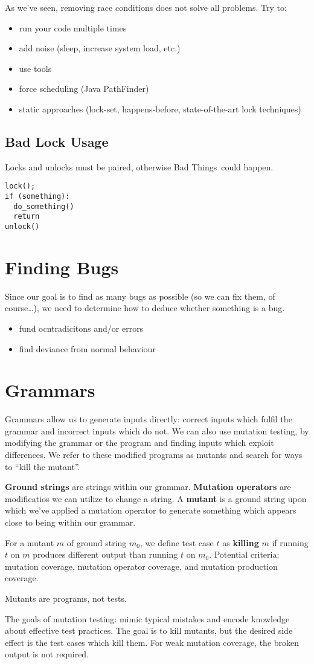 \documentclass[12pt]{article}
\begin{document}
As we've seen, removing race conditions does not solve all problems. Try to:
\begin{itemize}
\item run your code multiple times
\item add noise (sleep, increase system load, etc.)
\item use tools
\item force scheduling (Java PathFinder)
\item static approaches (lock-set, happens-before, state-of-the-art lock techniques)
\end{itemize}

\subsection{Bad Lock Usage}
Locks and unlocks must be paired, otherwise Bad Things\texttrademark\ could happen.
\begin{verbatim}
lock();
if (something):
  do_something()
  return
unlock()
\end{verbatim}

\section{Finding Bugs}
Since our goal is to find as many bugs as possible (so we can fix them, of course\dots), we need to determine how to deduce whether something is a bug.
\begin{itemize}
\item fund ocntradicitons and/or errors
\item find deviance from normal behaviour
\end{itemize}

\section{Grammars}

Grammars allow us to generate inputs directly: correct inputs which fulfil the grammar and incorrect inputs which do not. We can also use mutation testing, by modifying the grammar or the program and finding inputs which exploit differences. We refer to these modified programs as mutants and search for ways to ``kill the mutant''.

{\bf Ground strings} are strings within our grammar. {\bf Mutation operators} are modificatios we can utilize to change a string. A {\bf mutant} is a ground string upon which we've applied a mutation operator to generate something which appears close to being within our grammar.

For a mutant $m$ of ground string $m_0$, we define test case $t$ as {\bf killing} $m$ if running $t$ on $m$ produces different output than running $t$ on $m_0$. Potential criteria: mutation coverage, mutation operator coverage, and mutation production coverage.

Mutants are programs, not tests.

The goals of mutation testing: mimic typical mistakes and encode knowledge about effective test practices. The goal is to kill mutants, but the desired side effect is the test cases which kill them. For weak mutation coverage, the broken output is not required.
\end{document}
